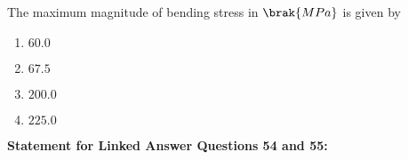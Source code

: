 \iffalse
\chapter{2010}
\author{EE24BTECH11037}
\section{me}
\fi

    \item The maximum magnitude of bending stress in $\brak{MPa}$ is given by 
    \begin{enumerate}
    \item $60.0$
    \item $67.5$
    \item $200.0$
    \item $225.0$
    \end{enumerate}
    \textbf{Statement for Linked Answer Questions 54 and 55:}\\

